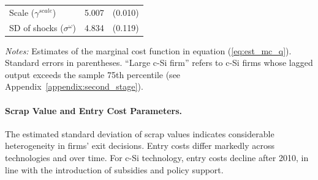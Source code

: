 \documentclass[12pt]{article}
\begin{document}
\begin{table}[!h]
\begin{threeparttable}
\begin{tabularx}{0.75\textwidth}{Xcc}
\qquad Scale ($\gamma^{scale}$) & 5.007 & (0.010) \\
\qquad SD of shocks ($\sigma^{\omega}$) & 4.834 & (0.119) \\
\bottomrule
\end{tabularx}
\begin{tablenotes}
  \item \textit{Notes:} Estimates of the marginal cost function in equation (\ref{eq:est_mc_q}). Standard errors in parentheses. ``Large c-Si firm'' refers to c-Si firms whose lagged output exceeds the sample 75th percentile (see Appendix~\ref{appendix:second_stage}). %
\end{tablenotes}
\end{threeparttable}
\end{table}


\paragraph{Scrap Value and Entry Cost Parameters.}
The estimated standard deviation of scrap values indicates considerable heterogeneity in firms’ exit decisions. Entry costs differ markedly across technologies and over time. For c-Si technology, entry costs decline after 2010, in line with the introduction of subsidies and policy support.
\end{document}
